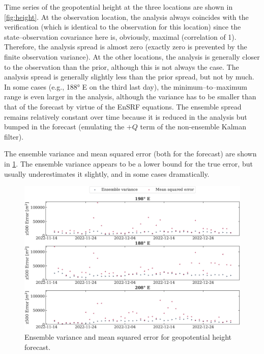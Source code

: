 \documentclass[parskip=half,DIV=16]{scrartcl}
\begin{document}
Time series of the geopotential height at the three locations are shown in \cref{fig:height}.
At the observation location, the analysis always coincides with the verification (which is identical to the observation for this location) since the state--observation covariance here is, obviously, maximal (correlation of 1). Therefore, the analysis spread is almost zero (exactly zero is prevented by the finite observation variance).
At the other locations, the analysis is generally closer to the observation than the prior, although this is not always the case. The analysis spread is generally slightly less than the prior spread, but not by much. In some cases (e.g., \ang{188} E on the third last day), the minimum--to--maximum range is even larger in the analysis, although the variance has to be smaller than that of the forecast by virtue of the EnSRF equations.
The ensemble spread remains relatively constant over time because it is reduced in the analysis but bumped in the forecast (emulating the $+Q$ term of the non-ensemble Kalman filter).

The ensemble variance and mean squared error (both for the forecast) are shown in \cref{fig:error}. The ensemble variance appears to be a lower bound for the true error, but usually underestimates it slightly, and in some cases dramatically.



\begin{figure}[h]
   \centering
   \includegraphics[width=\textwidth]{figures/height_error.pdf}
   \caption{Ensemble variance and mean squared error for geopotential height forecast.}
   \label{fig:error}
\end{figure}
\end{document}
